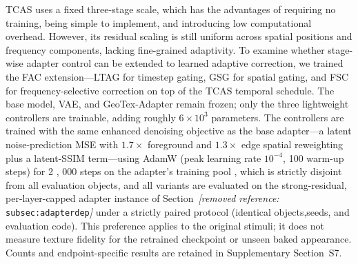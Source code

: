 \documentclass[times,twocolumn,final]{elsarticle}
\providecommand{\DIFadd}[1]{{\protect\color{blue} \sf #1}} %
\providecommand{\DIFdel}[1]{{\protect\color{red} \scriptsize #1}} %
\providecommand{\DIFaddbegin}{} %
\providecommand{\DIFaddend}{} %
\providecommand{\DIFdelend}{} %
\begin{document}

\DIFdel{TCAS uses a fixed three-stage scale, which has the advantages of requiring no training, being simple to implement, and introducing low computational overhead. However, its residual scaling is still uniform across spatial positions and frequency components, lacking fine-grained adaptivity. To examine whether stage-wise adapter control can be extended to learned adaptive correction, we trained the FAC extension---LTAG for timestep gating, GSG for spatial gating, and FSC for frequency-selective correction on top of the TCAS temporal schedule. The base model, VAE, and GeoTex-Adapter remain frozen; only the three lightweight controllers are trainable, adding roughly $6\times10^{3}$ parameters.
The controllers are trained with the same enhanced denoising objective as the base adapter---a latent noise-prediction MSE with $1.7\times$ foreground and $1.3\times$ edge spatial reweighting plus a latent-SSIM term---using AdamW (peak learning rate $10^{-4}$, 100 warm-up steps) for 2}%
\DIFdel{,}%
\DIFdel{000 steps on the adapter's training pool , which is strictly disjoint from all evaluation objects, and all variants are evaluated on the strong-residual, per-layer-capped adapter instance of Section~\textit{[removed reference: }\texttt{subsec:adapterdep}\textit{]} under a strictly paired protocol (identical objects,seeds, and evaluation code).
}\DIFdelend \DIFaddbegin \DIFadd{This preference applies to the original stimuli; it does not measure texture fidelity for the retrained checkpoint or unseen baked appearance. Counts and endpoint-specific results are retained in Supplementary Section~S7.
}\DIFaddend 
\end{document}
